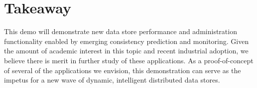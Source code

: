 
\section{Takeaway}

This demo will demonstrate new data store performance and
administration functionality enabled by emerging consistency
prediction and monitoring. Given the amount of academic interest in
this topic and recent industrial adoption, we believe there is merit
in further study of these applications. As a proof-of-concept of
several of the applications we envision, this demonstration can serve
as the impetus for a new wave of dynamic, intelligent distributed data
stores.
